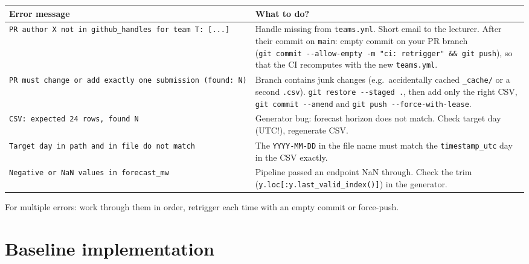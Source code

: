 \documentclass[
  english,
  letterpaper,
]{scrbook}
\newcounter{none} %
\begin{document}
{\def\LTcaptype{none} %
\begin{longtable}[]{@{}
  >{\raggedright\arraybackslash}p{}
  >{\raggedright\arraybackslash}p{}@{}}
\toprule\noalign{}
\begin{minipage}[b]{\linewidth}\raggedright
Error message
\end{minipage} & \begin{minipage}[b]{\linewidth}\raggedright
What to do?
\end{minipage} \\
\midrule\noalign{}
\endhead
\bottomrule\noalign{}
\endlastfoot
\texttt{PR\ author\ \textquotesingle{}X\textquotesingle{}\ not\ in\ github\_handles\ for\ team\ \textquotesingle{}T\textquotesingle{}:\ {[}...{]}}
& Handle missing from \texttt{teams.yml}. Short email to the lecturer.
After their commit on \texttt{main}: empty commit on your PR branch
(\texttt{git\ commit\ -\/-allow-empty\ -m\ "ci:\ retrigger"\ \&\&\ git\ push}),
so that the CI recomputes with the new \texttt{teams.yml}. \\
\texttt{PR\ must\ change\ or\ add\ exactly\ one\ submission\ (found:\ N)}
& Branch contains junk changes (e.g.~accidentally cached
\texttt{\_cache/} or a second \texttt{.csv}).
\texttt{git\ restore\ -\/-staged\ .}, then add only the right CSV,
\texttt{git\ commit\ -\/-amend} and
\texttt{git\ push\ -\/-force-with-lease}. \\
\texttt{CSV:\ expected\ 24\ rows,\ found\ N} & Generator bug: forecast
horizon does not match. Check target day (UTC!), regenerate CSV. \\
\texttt{Target\ day\ in\ path\ and\ in\ file\ do\ not\ match} & The
\texttt{YYYY-MM-DD} in the file name must match the
\texttt{timestamp\_utc} day in the CSV exactly. \\
\texttt{Negative\ or\ NaN\ values\ in\ forecast\_mw} & Pipeline passed
an endpoint NaN through. Check the trim
(\texttt{y.loc{[}:y.last\_valid\_index(){]}}) in the generator. \\
\end{longtable}
}

For multiple errors: work through them in order, retrigger each time
with an empty commit or force-push.

\section{Baseline implementation}\label{sec-baseline-skript}
\end{document}
